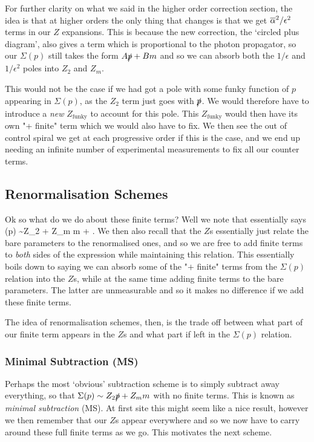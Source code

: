 \br 
    For further clarity on what we said in the higher order correction section, the idea is that at higher orders the only thing that changes is that we get $\overline{\alpha}^2/\epsilon^2$ terms in our $Z$ expansions. This is because the new correction, the `circled plus diagram', also gives a term which is proportional to the photon propagator, so our $\Sigma(p)$ still takes the form $A\slashed{p}+ Bm$ and so we can absorb both the $1/\epsilon$ and $1/\epsilon^2$ poles into $Z_2$ and $Z_m$. 
    
    This would not be the case if we had got a pole with some funky function of $p$ appearing in $\Sigma(p)$, as the $Z_2$ term just goes with $\slashed{p}$. We would therefore have to introduce a \textit{new} $Z_{\text{funky}}$ to account for this pole. This $Z_{\text{funky}}$ would then have its own "+ finite" term which we would also have to fix. We then see the out of control spiral we get at each progressive order if this is the case, and we end up needing an infinite number of experimental measurements to fix all our counter terms. 
\er 

\subsection{Renormalisation Schemes}

Ok so what do we do about these finite terms? Well we note that  essentially says 
\bse 
    \Sigma(p) \sim Z_2  + Z_m m + .
\ese 
We then also recall that the $Z$s essentially just relate the bare parameters to the renormalised ones, and so we are free to add finite terms to \textit{both} sides of the expression while maintaining this relation. This essentially boils down to saying we can absorb some of the "$+$ finite" terms from the $\Sigma(p)$ relation into the $Z$s, while at the same time adding finite terms to the bare parameters. The latter are unmeasurable and so it makes no difference if we add these finite terms.

The idea of renormalisation schemes, then, is the trade off between what part of our finite term appears in the $Z$s and what part if left in the $\Sigma(p)$ relation. 

\subsubsection{Minimal Subtraction (MS)}

Perhaps the most `obvious' subtraction scheme is to simply subtract away everything, so that $\Sigma(p) \sim Z_2 \slashed{p} + Z_m m$ with no finite terms. This is known as \textit{minimal subtraction} (MS). At first site this might seem like a nice result, however we then remember that our $Z$s appear everywhere and so we now have to carry around these full finite terms as we go. This motivates the next scheme.

